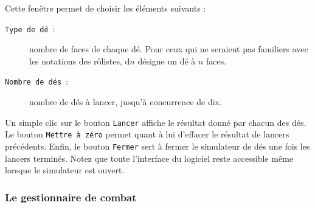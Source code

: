\documentclass[a4paper,12pt]{article}
\newcommand*{\interfaceitem}[1]{\texttt{#1}}
\begin{document}
Cette fenêtre permet de choisir les éléments suivants :
\begin{description}
    \item[\interfaceitem{Type de dé}~:]{nombre de faces de chaque dé. Pour ceux qui ne seraient pas familiers avec les notations des rôlistes, d$n$ désigne un dé à $n$ faces.}
    \item[\interfaceitem{Nombre de dés}~:]{nombre de dés à lancer, jusqu'à concurrence de dix.}
\end{description}
Un simple clic sur le bouton \interfaceitem{Lancer} affiche le résultat donné par chacun des dés.
Le bouton \interfaceitem{Mettre à zéro} permet quant à lui d'effacer le résultat de lancers précédents.
Enfin, le bouton \interfaceitem{Fermer} sert à fermer le simulateur de dés une fois les lancers terminés.
Notez que toute l'interface du logiciel reste accessible même lorsque le simulateur est ouvert.

\subsubsection{Le gestionnaire de combat}
\label{sec:combat}
\end{document}
